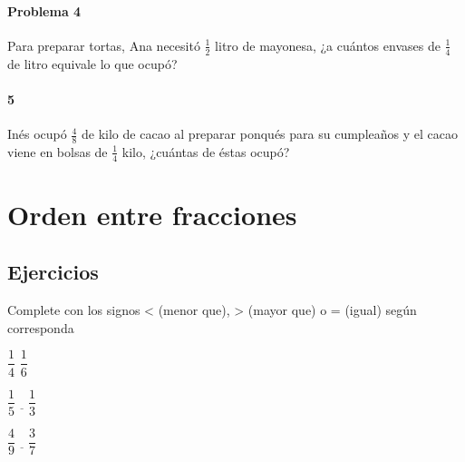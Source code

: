 \documentclass[10pt,twoside]{article}
\begin{document}
\paragraph*{Problema 4}
Para preparar tortas, Ana necesitó $\frac{1}{2}$ litro de mayonesa, ¿a cuántos envases de $\frac{1}{4}$ de litro equivale lo que ocup\'{o}?
\paragraph*{5}
Inés ocupó $\frac{4}{8}$ de kilo de cacao al preparar ponqués para su cumpleaños y el cacao viene en bolsas de $\frac{1}{4}$ kilo, ¿cuántas de éstas ocupó?
\section*{Orden entre fracciones}
\subsection*{Ejercicios}
Complete con los signos < (menor que), > (mayor que) o = (igual) según corresponda
\begin{itemize}
\begin{multicols}{3}
\item $\dfrac{1}{4}$ \underline{\quad} $\dfrac{1}{6}$
\item $\dfrac{1}{5}\underline{\quad}\dfrac{1}{3}$
\item $\dfrac{4}{9}\underline{\quad}\dfrac{3}{7}$
\end{multicols}
\end{itemize}
\end{document}
